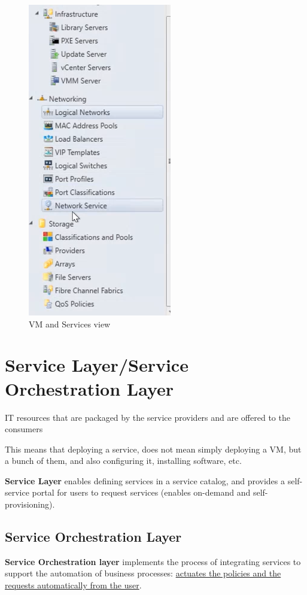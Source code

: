 \begin{paracol}{2}
\begin{figure}[htbp]
      \includegraphics[width=0.45\columnwidth]{images/Control_FabricView.png}
      \caption{VM and Services view}
   \end{figure}
   \end{paracol}

   
\section{Service Layer/Service Orchestration Layer}

\begin{definition}
   \label{def:cloudservice}
   IT resources that are packaged by the service providers and are offered to the consumers
\end{definition}
This means that deploying a service, does not mean simply deploying a VM, but a bunch of them, and also configuring it, installing software, etc. 

\textbf{Service Layer} enables defining services in a service catalog, and provides a self-service portal for users to request services (enables on-demand and self-provisioning).

\subsection{Service Orchestration Layer}
\textbf{Service Orchestration layer} implements the process of integrating services to support the automation of business processes:
\ul{actuates the policies and the requests automatically from the user}.

